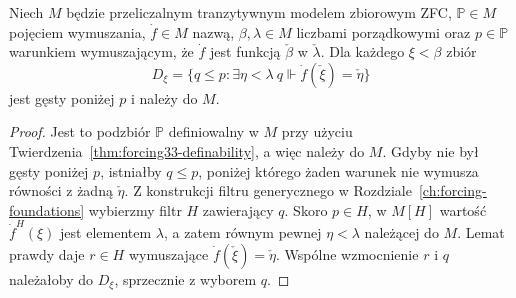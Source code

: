 \begin{lemat}
\label{lem:forcing34-decide-ordinal}
Niech $M$ będzie przeliczalnym
tranzytywnym modelem zbiorowym ZFC,
$\mathbb P\in M$ pojęciem wymuszania,
$\dot f\in M$ nazwą,
$\beta,\lambda\in M$ liczbami
porządkowymi oraz $p\in\mathbb P$
warunkiem wymuszającym, że
$\dot f$ jest funkcją $\check\beta$
w $\check\lambda$. Dla każdego
$\xi<\beta$ zbiór
\[
 D_\xi=\{q\leq p:\exists\eta<\lambda\
      q\Vdash\dot f(\check\xi)=\check\eta\}
\]
jest gęsty poniżej $p$ i należy
do $M$.
\end{lemat}
\begin{proof}
Jest to podzbiór $\mathbb P$
definiowalny w $M$ przy użyciu
Twierdzenia~\ref{thm:forcing33-definability},
a więc należy do $M$.
Gdyby nie był gęsty poniżej $p$,
istniałby $q\leq p$, poniżej
którego żaden warunek nie wymusza
równości z żadną $\check\eta$.
Z konstrukcji filtru generycznego
w Rozdziale~\ref{ch:forcing-foundations}
wybierzmy filtr $H$ zawierający $q$.
Skoro $p\in H$, w $M[H]$
wartość $\dot f^H(\xi)$ jest
elementem $\lambda$, a zatem
równym pewnej $\eta<\lambda$
należącej do $M$. Lemat prawdy
daje $r\in H$ wymuszające
$\dot f(\check\xi)=\check\eta$.
Wspólne wzmocnienie $r$ i $q$
należałoby do $D_\xi$,
sprzecznie z wyborem $q$.
\end{proof}

